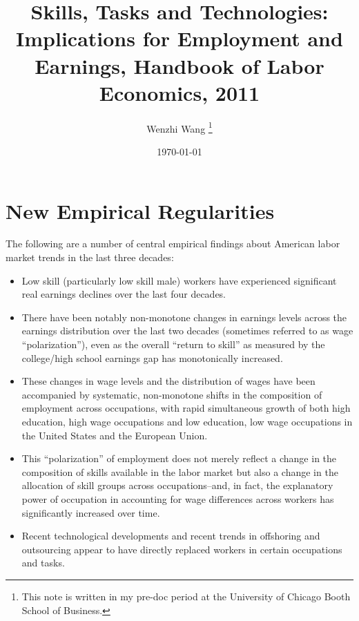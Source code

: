 \documentclass[12pt]{article}
\theoremstyle{definition}
\begin{document}

\title{\bf Skills, Tasks and Technologies: Implications for Employment and Earnings, Handbook of Labor Economics, 2011}
\author{Wenzhi Wang \thanks{This note is written in my pre-doc period at the University of Chicago Booth School of Business.} } 
\date{\today}
\maketitle




\section{New Empirical Regularities} \label{sec_empicial_regularities}

The following are a number of central empirical findings about American labor market trends in the last three decades: 
\begin{itemize}[topsep=0pt, leftmargin=30pt, itemsep=0pt]
	\setlength{\parskip}{8pt} 
	\item Low skill (particularly low skill male) workers have experienced significant real earnings declines over the last four decades.
	\item There have been notably non-monotone changes in earnings levels across the earnings distribution over the last two decades (sometimes referred to as wage ``polarization''), even as the overall ``return to skill'' as measured by the college/high school earnings gap has monotonically increased.
	\item These changes in wage levels and the distribution of wages have been accompanied by systematic, non-monotone shifts in the composition of employment across occupations, with rapid simultaneous growth of both high education, high wage occupations and low education, low wage occupations in the United States and the European Union.
	\item This ``polarization'' of employment does not merely reflect a change in the composition of skills available in the labor market but also a change in the allocation of skill groups across occupations--and, in fact, the explanatory power of occupation in accounting for wage differences across workers has significantly increased over time.
	\item Recent technological developments and recent trends in offshoring and outsourcing appear to have directly replaced workers in certain occupations and tasks.
\end{itemize}
\end{document}
